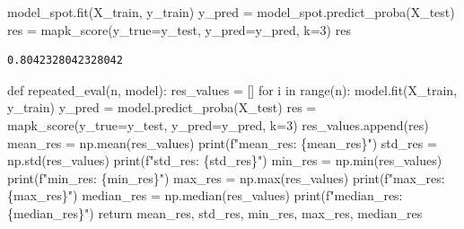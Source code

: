 \documentclass[
  letterpaper,
  DIV=11,
  numbers=noendperiod]{scrreprt}
\newenvironment{Shaded}{\begin{snugshade}}{\end{snugshade}}
\newcommand{\BuiltInTok}[1]{\textcolor[rgb]{0.00,0.23,0.31}{#1}}
\newcommand{\ControlFlowTok}[1]{\textcolor[rgb]{0.00,0.23,0.31}{#1}}
\newcommand{\DecValTok}[1]{\textcolor[rgb]{0.68,0.00,0.00}{#1}}
\newcommand{\KeywordTok}[1]{\textcolor[rgb]{0.00,0.23,0.31}{#1}}
\newcommand{\NormalTok}[1]{\textcolor[rgb]{0.00,0.23,0.31}{#1}}
\newcommand{\OperatorTok}[1]{\textcolor[rgb]{0.37,0.37,0.37}{#1}}
\newcommand{\SpecialCharTok}[1]{\textcolor[rgb]{0.37,0.37,0.37}{#1}}
\newcommand{\SpecialStringTok}[1]{\textcolor[rgb]{0.13,0.47,0.30}{#1}}
\begin{document}
\begin{Shaded}
\begin{Highlighting}[]
\NormalTok{model\_spot.fit(X\_train, y\_train)}
\NormalTok{y\_pred }\OperatorTok{=}\NormalTok{ model\_spot.predict\_proba(X\_test)}
\NormalTok{res }\OperatorTok{=}\NormalTok{ mapk\_score(y\_true}\OperatorTok{=}\NormalTok{y\_test, y\_pred}\OperatorTok{=}\NormalTok{y\_pred, k}\OperatorTok{=}\DecValTok{3}\NormalTok{)}
\NormalTok{res}
\end{Highlighting}
\end{Shaded}

\begin{verbatim}
0.8042328042328042
\end{verbatim}

\begin{Shaded}
\begin{Highlighting}[]
\KeywordTok{def}\NormalTok{ repeated\_eval(n, model):}
\NormalTok{    res\_values }\OperatorTok{=}\NormalTok{ []}
    \ControlFlowTok{for}\NormalTok{ i }\KeywordTok{in} \BuiltInTok{range}\NormalTok{(n):}
\NormalTok{        model.fit(X\_train, y\_train)}
\NormalTok{        y\_pred }\OperatorTok{=}\NormalTok{ model.predict\_proba(X\_test)}
\NormalTok{        res }\OperatorTok{=}\NormalTok{ mapk\_score(y\_true}\OperatorTok{=}\NormalTok{y\_test, y\_pred}\OperatorTok{=}\NormalTok{y\_pred, k}\OperatorTok{=}\DecValTok{3}\NormalTok{)}
\NormalTok{        res\_values.append(res)}
\NormalTok{    mean\_res }\OperatorTok{=}\NormalTok{ np.mean(res\_values)}
    \BuiltInTok{print}\NormalTok{(}\SpecialStringTok{f"mean\_res: }\SpecialCharTok{\{}\NormalTok{mean\_res}\SpecialCharTok{\}}\SpecialStringTok{"}\NormalTok{)}
\NormalTok{    std\_res }\OperatorTok{=}\NormalTok{ np.std(res\_values)}
    \BuiltInTok{print}\NormalTok{(}\SpecialStringTok{f"std\_res: }\SpecialCharTok{\{}\NormalTok{std\_res}\SpecialCharTok{\}}\SpecialStringTok{"}\NormalTok{)}
\NormalTok{    min\_res }\OperatorTok{=}\NormalTok{ np.}\BuiltInTok{min}\NormalTok{(res\_values)}
    \BuiltInTok{print}\NormalTok{(}\SpecialStringTok{f"min\_res: }\SpecialCharTok{\{}\NormalTok{min\_res}\SpecialCharTok{\}}\SpecialStringTok{"}\NormalTok{)}
\NormalTok{    max\_res }\OperatorTok{=}\NormalTok{ np.}\BuiltInTok{max}\NormalTok{(res\_values)}
    \BuiltInTok{print}\NormalTok{(}\SpecialStringTok{f"max\_res: }\SpecialCharTok{\{}\NormalTok{max\_res}\SpecialCharTok{\}}\SpecialStringTok{"}\NormalTok{)}
\NormalTok{    median\_res }\OperatorTok{=}\NormalTok{ np.median(res\_values)}
    \BuiltInTok{print}\NormalTok{(}\SpecialStringTok{f"median\_res: }\SpecialCharTok{\{}\NormalTok{median\_res}\SpecialCharTok{\}}\SpecialStringTok{"}\NormalTok{)}
    \ControlFlowTok{return}\NormalTok{ mean\_res, std\_res, min\_res, max\_res, median\_res}
\end{Highlighting}
\end{Shaded}
\end{document}
